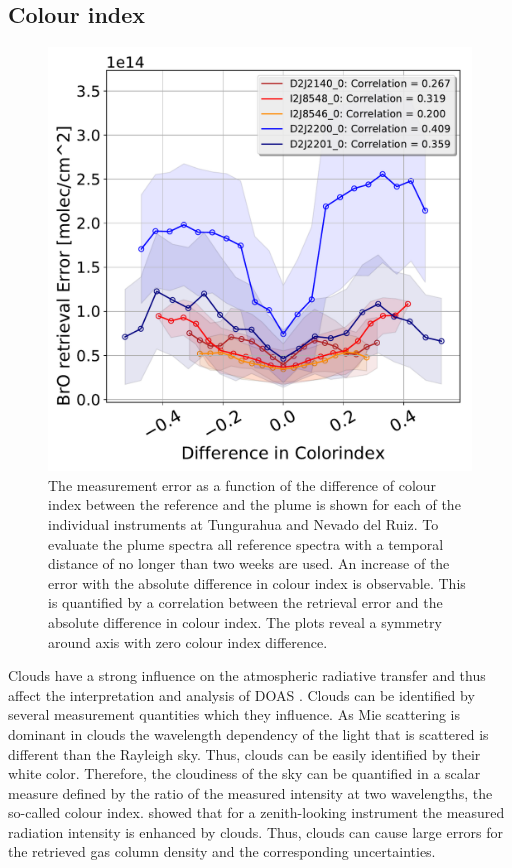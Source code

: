 \subsection{ Colour index}
\begin{figure}
	\centering
	\includegraphics[width=0.7\linewidth]{Bilder/DiffColidxallInstruments}
	\caption{The  measurement error as a function of the difference of colour index between the reference and the plume is shown for each of the individual instruments at Tungurahua and Nevado del Ruiz. To evaluate the plume spectra all reference spectra with a temporal distance of no longer than two weeks are used. An increase of the  error with the absolute difference in colour index is observable. This is quantified by a correlation between the  retrieval error and the absolute difference in colour index. The plots reveal a symmetry around axis with zero colour index difference. }
	\label{fig:diffcolidx}
\end{figure}
Clouds  have  a  strong  influence  on  the  atmospheric  radiative  transfer  and  thus  affect  the  interpretation  and  analysis of DOAS \citep{wagner2014cloud}.
Clouds can be identified by several measurement quantities which they influence.
As Mie scattering is dominant in clouds the wavelength dependency of the light that is scattered is different than the Rayleigh sky. Thus, clouds can be easily identified by their white color.
Therefore, the cloudiness of the sky can be quantified in a scalar measure defined by the ratio of the measured intensity at two wavelengths, the so-called colour index.
\cite{wagner2014cloud} showed that for a zenith-looking instrument the measured radiation intensity is enhanced by clouds. Thus, clouds can cause large errors for the retrieved gas column density and the corresponding uncertainties. 
